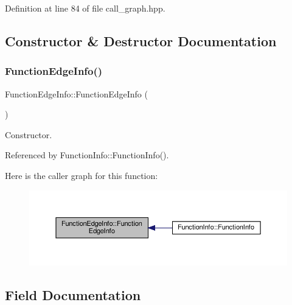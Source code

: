Definition at line 84 of file call\+\_\+graph.\+hpp.



\subsection{Constructor \& Destructor Documentation}
\mbox{\label{structFunctionEdgeInfo_aaadeb68f02787ec0ba752c4da892fcdc}} 
\subsubsection{\texorpdfstring{Function\+Edge\+Info()}{FunctionEdgeInfo()}}
{\footnotesize\ttfamily Function\+Edge\+Info\+::\+Function\+Edge\+Info (\begin{DoxyParamCaption}{ }\end{DoxyParamCaption})\hspace{0.3cm}{\ttfamily [default]}}



Constructor. 



Referenced by Function\+Info\+::\+Function\+Info().

Here is the caller graph for this function\+:
\nopagebreak
\begin{figure}[H]
\begin{center}
\leavevmode
\includegraphics[width=350pt]{d3/d48/structFunctionEdgeInfo_aaadeb68f02787ec0ba752c4da892fcdc_icgraph}
\end{center}
\end{figure}


\subsection{Field Documentation}
\mbox{\label{structFunctionEdgeInfo_a554509310906374822a4f0df057024ac}} 
